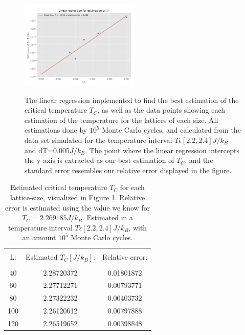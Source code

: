 \documentclass[10pt, nofootinbib, twocolumn]{revtex4-1}
\begin{document}
\newpage
\begin{figure}[H]
    \caption{The linear regression implemented to find the best estimation of the critical temperature $T_C$, as well as the data points showing each estimation of the temperature for the lattices of each size. All estimations done by $10^5$ Monte Carlo cycles, and calculated from the data set simulated for the temperature interval $T\epsilon [2.2,2.4]$$J/k_B$ and dT=0.005$J/k_B$. The point where the linear regression intercepts the y-axis is extracted as our best estimation of $T_C$, and the standard error resembles our relative error displayed in the figure.}     
    \centering
    \includegraphics[width = 0.5\textwidth]{figures/linear.pdf} 
    \label{fig:linear}
\end{figure} 

\begin{center}
    \begin{table}[h]
    \caption{Estimated critical temperature $T_C$ for each lattice-size, visualized in Figure \ref{fig:linear}. Relative error is estimated using the value we know for $T_C=2.269185J/k_B$. Estimated in a temperature interval $T\epsilon [2.2,2.4]$$J/k_B$, with an amount $10^5$ Monte Carlo cycles.}
        \begin{tabular*}{0.5\textwidth}{@{\extracolsep{\fill}}ccc}
        \toprule
        \hline \\
        L: & Estimated $T_C$$[J/k_B]$: &  Relative error: \\
        \midrule
        \hline \\
        40 & 2.28720372 &  0.01801872 \\
        60 & 2.27712271 &   0.00793771\\
        80 & 2.27322232   &  0.00403732 \\
        100 & 2.26120612 &   0.00797888\\
        120 & 2.26519652 &  0.00398848 \\
        \hline
        \bottomrule
        \end{tabular*}\label{tab:tc}
    \end{table}
\end{center}
\end{document}
